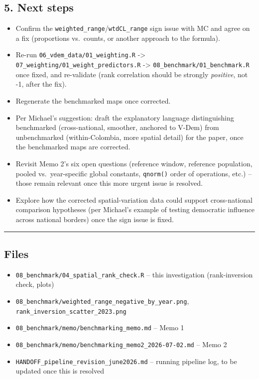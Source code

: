 \documentclass[
]{article}
\providecommand{\tightlist}{%
  \setlength{\itemsep}{0pt}\setlength{\parskip}{0pt}}
\begin{document}
\hypertarget{next-steps}{%
\subsection{5. Next steps}\label{next-steps}}

\begin{itemize}
\tightlist
\item[$\square$]
  Confirm the \texttt{weighted\_range}/\texttt{wtdCL\_range} sign issue
  with MC and agree on a fix (proportions vs.~counts, or another
  approach to the formula).
\item[$\square$]
  Re-run \texttt{06\_vdem\_data/01\_weighting.R} -\textgreater{}
  \texttt{07\_weighting/01\_weight\_predictors.R} -\textgreater{}
  \texttt{08\_benchmark/01\_benchmark.R} once fixed, and re-validate
  (rank correlation should be strongly \emph{positive}, not -1, after
  the fix).
\item[$\square$]
  Regenerate the benchmarked maps once corrected.
\item[$\square$]
  Per Michael's suggestion: draft the explanatory language
  distinguishing benchmarked (cross-national, smoother, anchored to
  V-Dem) from unbenchmarked (within-Colombia, more spatial detail) for
  the paper, once the benchmarked maps are corrected.
\item[$\square$]
  Revisit Memo 2's six open questions (reference window, reference
  population, pooled vs.~year-specific global constants,
  \texttt{qnorm()} order of operations, etc.) -- those remain relevant
  once this more urgent issue is resolved.
\item[$\square$]
  Explore how the corrected spatial-variation data could support
  cross-national comparison hypotheses (per Michael's example of testing
  democratic influence across national borders) once the sign issue is
  fixed.
\end{itemize}

\begin{center}\rule{0.5\linewidth}{0.5pt}\end{center}

\hypertarget{files}{%
\subsection{Files}\label{files}}

\begin{itemize}
\tightlist
\item
  \texttt{08\_benchmark/04\_spatial\_rank\_check.R} -- this
  investigation (rank-inversion check, plots)
\item
  \texttt{08\_benchmark/weighted\_range\_negative\_by\_year.png},
  \texttt{rank\_inversion\_scatter\_2023.png}
\item
  \texttt{08\_benchmark/memo/benchmarking\_memo.md} -- Memo 1
\item
  \texttt{08\_benchmark/memo/benchmarking\_memo2\_2026-07-02.md} -- Memo
  2
\item
  \texttt{HANDOFF\_pipeline\_revision\_june2026.md} -- running pipeline
  log, to be updated once this is resolved
\end{itemize}
\end{document}
